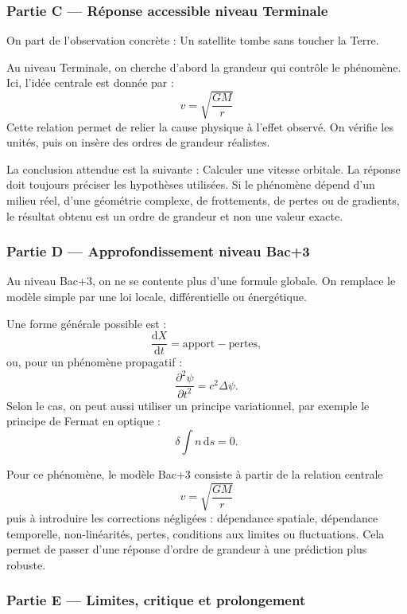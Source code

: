 \documentclass[11pt,a4paper]{article}
\begin{document}
\subsubsection*{Partie C — Réponse accessible niveau Terminale}

\begin{corrigebox}
On part de l'observation concrète : Un satellite tombe sans toucher la Terre.

Au niveau Terminale, on cherche d'abord la grandeur qui contrôle le phénomène. Ici, l'idée centrale est donnée par :
\[
v=\sqrt{\frac{GM}{r}}
\]
Cette relation permet de relier la cause physique à l'effet observé. On vérifie les unités, puis on insère des ordres de grandeur réalistes.

La conclusion attendue est la suivante : Calculer une vitesse orbitale. La réponse doit toujours préciser les hypothèses utilisées. Si le phénomène dépend d'un milieu réel, d'une géométrie complexe, de frottements, de pertes ou de gradients, le résultat obtenu est un ordre de grandeur et non une valeur exacte.
\end{corrigebox}

\subsubsection*{Partie D — Approfondissement niveau Bac+3}

\begin{approfondissementbox}
Au niveau Bac+3, on ne se contente plus d'une formule globale. On remplace le modèle simple par une loi locale, différentielle ou énergétique.

Une forme générale possible est :
\[
\frac{\mathrm d X}{\mathrm dt}=\text{apport}-\text{pertes},
\]
ou, pour un phénomène propagatif :
\[
\frac{\partial^2 \psi}{\partial t^2}=c^2\Delta\psi.
\]
Selon le cas, on peut aussi utiliser un principe variationnel, par exemple le principe de Fermat en optique :
\[
\delta \int n\,\mathrm ds=0.
\]

Pour ce phénomène, le modèle Bac+3 consiste à partir de la relation centrale
\[
v=\sqrt{\frac{GM}{r}}
\]
puis à introduire les corrections négligées : dépendance spatiale, dépendance temporelle, non-linéarités, pertes, conditions aux limites ou fluctuations. Cela permet de passer d'une réponse d'ordre de grandeur à une prédiction plus robuste.
\end{approfondissementbox}

\subsubsection*{Partie E — Limites, critique et prolongement}
\end{document}
